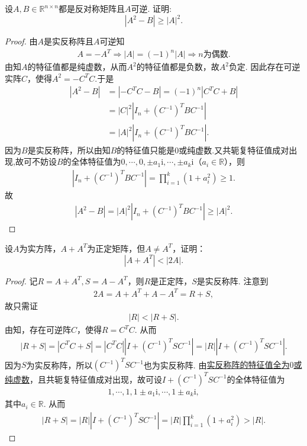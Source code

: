 \documentclass[../../main.tex]{subfiles}%
\begin{document}
\begin{example}
设$A,B \in \mathbb{R}^{n \times n}$都是反对称矩阵且$A$可逆. 证明:
$$|A^2 - B| \geqslant |A|^2.$$
\end{example}
\begin{proof}
由$A$是实反称阵且$A$可逆知
\begin{align*}
A=-A^T\Longrightarrow |A|=(-1)^n|A|\Longrightarrow n\text{为偶数}.
\end{align*}
由知$A$的特征值都是纯虚数，从而$A^2$的特征值都是负数，故$A^2$负定.
因此存在可逆实阵$C$，使得$A^2=-C^TC$.于是
\begin{align*}
|A^2-B|&=|-C^TC-B|=(-1)^n|C^TC+B|\\
&=|C|^2|I_n+(C^{-1})^TBC^{-1}|\\
&=|A|^2|I_n+(C^{-1})^TBC^{-1}|.
\end{align*}
因为$B$是实反称阵，所以由知$B$的特征值只能是$0$或纯虚数.又共轭复特征值成对出现,故可不妨设$B$的全体特征值为$0,\cdots,0,\pm a_1\mathrm{i},\cdots,\pm a_k\mathrm{i}$（$a_i\in\mathbb{R}$），则
\begin{align*}
|I_n+(C^{-1})^TBC^{-1}|=\prod_{i=1}^k(1+a_i^2)\geqslant1.
\end{align*}
故
\begin{align*}
|A^2-B|=|A|^2|I_n+(C^{-1})^TBC^{-1}|\geqslant|A|^2.
\end{align*}
\end{proof}

\begin{example}
设$A$为实方阵，$A + A^T$为正定矩阵，但$A \ne A^T$，证明：
$$|A + A^T| < |2A|.$$
\end{example}
\begin{proof}
记$R=A+A^T,S=A-A^T$，则$R$是正定阵，$S$是实反称阵. 注意到
\begin{align*}
2A=A+A^T+A-A^T=R+S,
\end{align*}
故只需证
\begin{align*}
|R|<|R+S|.
\end{align*}
由知，存在可逆阵$C$，使得$R=C^TC$. 从而
\begin{align*}
|R+S|=|C^TC+S|=|C^TC||I+(C^{-1})^TSC^{-1}|=|R||I+(C^{-1})^TSC^{-1}|.
\end{align*}
因为$S$为实反称阵，所以$(C^{-1})^TSC^{-1}$也为实反称阵. 由\hyperref[proposition:实对称(反称)阵的特征值]{实反称阵的特征值全为$0$或纯虚数}，且共轭复特征值成对出现，故可设$I+(C^{-1})^TSC^{-1}$的全体特征值为
\begin{align*}
1,\cdots,1,1\pm a_1\mathrm{i},\cdots,1\pm a_k\mathrm{i},
\end{align*}
其中$a_i\in\mathbb{R}$. 从而
\begin{align*}
|R+S|=|R||I+(C^{-1})^TSC^{-1}|=|R|\prod_{i=1}^k(1+a_i^2)>|R|.
\end{align*}
\end{proof}
\end{document}
